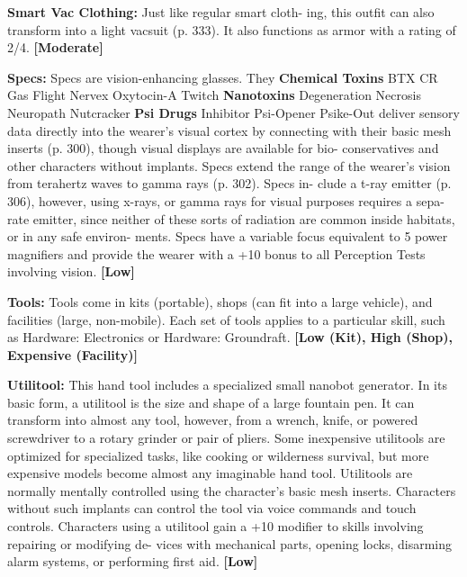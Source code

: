 \textbf{Smart Vac Clothing:} Just like regular smart cloth-
ing, this outfit can also transform into a light vacsuit 
(p. 333). It also functions as armor with a rating of 
2/4. \textbf{[Moderate]}

\textbf{Specs:  }Specs are vision-enhancing glasses. They 
\textbf{Chemical Toxins}
BTX
CR Gas
Flight
Nervex
Oxytocin-A
Twitch
\textbf{Nanotoxins}
Degeneration
Necrosis
Neuropath
Nutcracker
\textbf{Psi Drugs}
Inhibitor
Psi-Opener
Psike-Out
deliver sensory data directly into the wearer's visual 
cortex by connecting with their basic mesh inserts 
(p. 300), though visual displays are available for bio-
conservatives and other characters without implants. 
Specs extend the range of the wearer's vision from 
terahertz waves to gamma rays (p. 302). Specs in-
clude a t-ray emitter (p. 306), however, using x-rays, 
or gamma rays for visual purposes requires a sepa-
rate emitter, since neither of these sorts of radiation 
are common inside habitats, or in any safe environ-
ments. Specs have a variable focus equivalent to 5 
power magnifiers and provide the wearer with a +10 
bonus to all Perception Tests involving vision. \textbf{[Low]}

\textbf{Tools: }Tools come in kits (portable), shops (can fit 
into a large vehicle), and facilities (large, non-mobile). 
Each set of tools applies to a particular skill, such 
as Hardware: Electronics or Hardware: Groundraft. 
\textbf{[Low (Kit), High (Shop), Expensive (Facility)]}

\textbf{Utilitool:} This hand tool includes a specialized 
small nanobot generator. In its basic form, a utilitool 
is the size and shape of a large fountain pen. It can 
transform into almost any tool, however, from a 
wrench, knife, or powered screwdriver to a rotary 
grinder or pair of pliers. Some inexpensive utilitools 
are optimized for specialized tasks, like cooking 
or wilderness survival, but more expensive models 
become almost any imaginable hand tool. Utilitools 
are normally mentally controlled using the character's 
basic mesh inserts. Characters without such implants 
can control the tool via voice commands and touch 
controls. Characters using a utilitool gain a +10 
modifier to skills involving repairing or modifying de-
vices with mechanical parts, opening locks, disarming 
alarm systems, or performing first aid. \textbf{[Low]}

